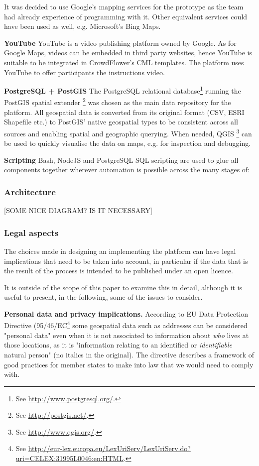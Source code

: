 It was decided to use Google's mapping services for the prototype as the team had already experience of programming with it. Other equivalent services could have been used as well, e.g. Microsoft's Bing Maps.

\textbf{YouTube} YouTube is a video publishing platform owned by Google. As for Google Maps, videos can be embedded in third party websites, hence YouTube is suitable to be integrated in CrowdFlower's CML templates. The platform uses YouTube to offer participants the instructions video.  

\textbf{PostgreSQL + PostGIS} The PostgreSQL relational database\footnote{See \url{http://www.postgresql.org/}.} running the PostGIS spatial extender \footnote{See \url{http://postgis.net/}.} was chosen as the main data repository for the platform. All geospatial data is converted from its original format (CSV, ESRI Shapefile etc.) to PostGIS' native geospatial types to be consistent across all sources and enabling spatial and geographic querying. When needed, QGIS \footnote{See \url{http://www.qgis.org/}.} can be used to quickly visualise the data on maps, e.g. for inspection and debugging.

\textbf{Scripting} Bash, NodeJS and PostgreSQL SQL scripting are used to glue all components together wherever automation is possible across the many stages of:  

\subsubsection{Architecture}

[SOME NICE DIAGRAM? IS IT NECESSARY]

\subsubsection{Legal aspects}

The choices made in designing an implementing the platform can have legal implications that need to be taken into account, in particular if the data that is the result of the process is intended to be published under an open licence.

It is outside of the scope of this paper to examine this in detail, although it is useful to present, in the following, some of the issues to consider.

\textbf{Personal data and privacy implications.} According to EU Data Protection Directive (95/46/EC\footnote{See \url{http://eur-lex.europa.eu/LexUriServ/LexUriServ.do?uri=CELEX:31995L0046:en:HTML}.} some geospatial data such as addresses can be considered "personal data" even when it is not associated to information about {\it who} lives at those locations, as it is "information relating to an identified or {\it identifiable} natural person" (no italics in the original). The directive describes a framework of good practices for member states to make into law that we would need to comply with.
	
